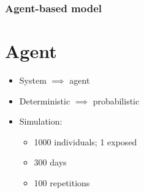 \documentclass[30pt]{beamer}
\begin{document}
\begin{frame}
\frametitle{Agent-based model}
\section{Agent}
%
%      
%       
\begin{itemize}
\item System $\implies$ agent
\item Deterministic $\implies$ probabilistic
\item Simulation:
\begin{itemize}
\item 1000 individuals; 1 exposed
\item 300 days
\item 100 repetitions
\end{itemize}
\end{itemize}
\end{frame}
\end{document}
